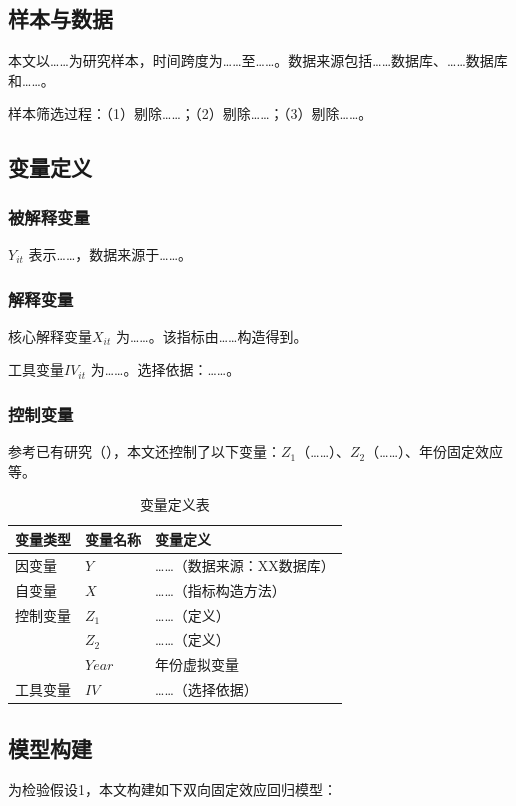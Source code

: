 \documentclass[10pt, UTF8, twocolumn]{ctexart}
\newcommand{\xiaosi}{\fontsize{12pt}{18pt}\selectfont}
\begin{document}
\subsection{样本与数据}
本文以……为研究样本，时间跨度为……至……。数据来源包括……数据库、……数据库和……。

样本筛选过程：（1）剔除……；（2）剔除……；（3）剔除……。

\subsection{变量定义}

\subsubsection{被解释变量}
$Y_{it}$ 表示……，数据来源于……。

\subsubsection{解释变量}
核心解释变量$X_{it}$ 为……。该指标由……构造得到。

工具变量$IV_{it}$ 为……。选择依据：……。

\subsubsection{控制变量}
参考已有研究（\cite{xxx}），本文还控制了以下变量：$Z_1$（……）、$Z_2$（……）、年份固定效应等。

\begin{table}[htbp]
\centering
\caption{变量定义表}
\label{tab:var}
\xiaosi
\begin{tabular}{p{2cm}p{2.5cm}p{5.5cm}}
\toprule
变量类型 & 变量名称 & 变量定义 \\
\midrule
因变量 & $Y$ & ……（数据来源：XX数据库）\\
\midrule
自变量 & $X$ & ……（指标构造方法）\\
\midrule
控制变量 & $Z_1$ & ……（定义）\\
& $Z_2$ & ……（定义）\\
& $Year$ & 年份虚拟变量\\
\midrule
工具变量 & $IV$ & ……（选择依据）\\
\bottomrule
\end{tabular}
\end{table}

\subsection{模型构建}
为检验假设1，本文构建如下双向固定效应回归模型：
\end{document}
